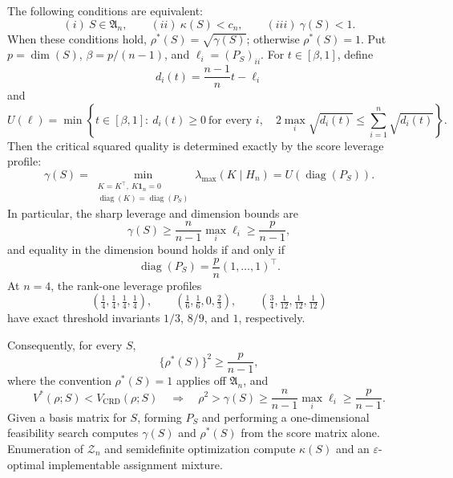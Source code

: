 The following conditions are equivalent:
\[
(i)\ S\in\mathfrak A_n,
\qquad
(ii)\ \kappa(S)<c_n,
\qquad
(iii)\ \gamma(S)<1.
\]
When these conditions hold, \(\rho^*(S)=\sqrt{\gamma(S)}\); otherwise \(\rho^*(S)=1\).  Put \(p=\dim(S)\), \(\beta=p/(n-1)\), and \(\ell_i=(P_S)_{ii}\).  For \(t\in[\beta,1]\), define
\[
d_i(t)=\frac{n-1}{n}t-\ell_i
\]
and
\[
U(\ell)=\min\left\{
t\in[\beta,1]:\ d_i(t)\geq0\ \text{for every }i,\quad
2\max_i\sqrt{d_i(t)}\leq\sum_{i=1}^n\sqrt{d_i(t)}
\right\}.
\]
Then the critical squared quality is determined exactly by the score leverage profile:
\[
\gamma(S)
=\min_{\substack{K=K^\top,\ K\mathbf1_n=0\\
\operatorname{diag}(K)=\operatorname{diag}(P_S)}}
\lambda_{\max}(K\mid H_n)
=U\!\left(\operatorname{diag}(P_S)\right).
\]
In particular, the sharp leverage and dimension bounds are
\[
\gamma(S)\geq\frac{n}{n-1}\max_i\ell_i
\geq\frac{p}{n-1},
\]
and equality in the dimension bound holds if and only if
\[
\operatorname{diag}(P_S)=\frac{p}{n}(1,\ldots,1)^\top.
\]
At \(n=4\), the rank-one leverage profiles
\[
\left(\tfrac14,\tfrac14,\tfrac14,\tfrac14\right),\qquad
\left(\tfrac16,\tfrac16,0,\tfrac23\right),\qquad
\left(\tfrac34,\tfrac1{12},\tfrac1{12},\tfrac1{12}\right)
\]
have exact threshold invariants \(1/3\), \(8/9\), and \(1\), respectively.

Consequently, for every \(S\),
\[
\{\rho^*(S)\}^2\geq\frac{p}{n-1},
\]
where the convention \(\rho^*(S)=1\) applies off \(\mathfrak A_n\), and
\[
V^*(\rho;S)<V_{\mathrm{CRD}}(\rho;S)
\quad\Longrightarrow\quad
\rho^2>\gamma(S)\geq\frac{n}{n-1}\max_i\ell_i
\geq\frac{p}{n-1}.
\]
Given a basis matrix for \(S\), forming \(P_S\) and performing a one-dimensional feasibility search computes \(\gamma(S)\) and \(\rho^*(S)\) from the score matrix alone.  Enumeration of \(\mathcal Z_n\) and semidefinite optimization compute \(\kappa(S)\) and an \(\varepsilon\)-optimal implementable assignment mixture.